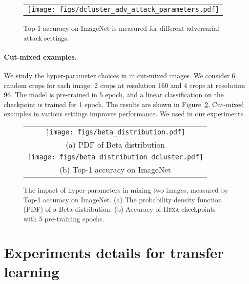 \documentclass[10pt,twocolumn,letterpaper]{article}
\newcommand{\shortname}{\textsc{Hexa}}
\begin{document}
\begin{figure}[h!]\vspace{-0mm}\centering
	\begin{tabular}{c}
	    \hspace{-4mm}		
		\texttt{[image: figs/dcluster\_adv\_attack\_parameters.pdf]}
	\end{tabular}
	\vspace{-2mm}
	\caption{Top-1 accuracy on ImageNet is measured for different adversarial attack settings.}
	\vspace{-2mm}
	\label{fig:adv_example_ablation}
\end{figure}


\paragraph{Cut-mixed examples.}
We study the hyper-parameter choices in  in cut-mixed images. We consider 6 random crops for each image: 2 crops at resolution 160 and 4 crops at resolution 96. The model is pre-trained in 5 epoch, and a linear classification on the checkpoint is trained for 1 epoch. The results are shown in Figure~\ref{fig:cutmix_example_ablation}. Cut-mixed examples in various settings improves performance. We used   in our experiments.

\begin{figure}[h!]\vspace{-0mm}\centering
	\begin{tabular}{c}
	    \hspace{-4mm}		
		\texttt{[image: figs/beta\_distribution.pdf]} \\
		(a) PDF of Beta distribution \\
	    \texttt{[image: figs/beta\_distribution\_dcluster.pdf]} \\
		(b) Top-1 accuracy on ImageNet
	\end{tabular}
	\vspace{-2mm}
	\caption{The impact of hyper-parameters in mixing two images, measured by Top-1 accuracy on ImageNet. (a) The probability density function (PDF) of a Beta distribution. (b) Accuracy of \shortname{} checkpoints with 5 pre-training epochs.}
	\vspace{-2mm}
	\label{fig:cutmix_example_ablation}
\end{figure}


\section{Experiments details for transfer learning}
\end{document}
